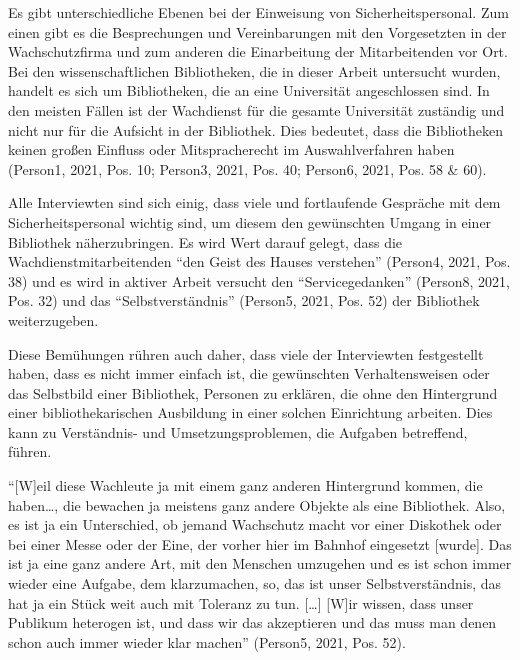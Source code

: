 \documentclass[a4paper,
fontsize=11pt,
oneside,
numbers=noperiodatend,
parskip=half-,
bibliography=totoc,
final
]{scrartcl}
\begin{document}
Es gibt unterschiedliche Ebenen bei der Einweisung von
Sicherheitspersonal. Zum einen gibt es die Besprechungen und
Vereinbarungen mit den Vorgesetzten in der Wachschutzfirma und zum
anderen die Einarbeitung der Mitarbeitenden vor Ort. Bei den
wissenschaftlichen Bibliotheken, die in dieser Arbeit untersucht wurden,
handelt es sich um Bibliotheken, die an eine Universität angeschlossen
sind. In den meisten Fällen ist der Wachdienst für die gesamte
Universität zuständig und nicht nur für die Aufsicht in der Bibliothek.
Dies bedeutet, dass die Bibliotheken keinen großen Einfluss oder
Mitspracherecht im Auswahlverfahren haben (Person1, 2021, Pos. 10;
Person3, 2021, Pos. 40; Person6, 2021, Pos. 58 \& 60).

Alle Interviewten sind sich einig, dass viele und fortlaufende Gespräche
mit dem Sicherheitspersonal wichtig sind, um diesem den gewünschten
Umgang in einer Bibliothek näherzubringen. Es wird Wert darauf gelegt,
dass die Wachdienstmitarbeitenden \enquote{den Geist des Hauses
verstehen} (Person4, 2021, Pos. 38) und es wird in aktiver Arbeit
versucht den \enquote{Servicegedanken} (Person8, 2021, Pos. 32) und das
\enquote{Selbstverständnis} (Person5, 2021, Pos. 52) der Bibliothek
weiterzugeben.

Diese Bemühungen rühren auch daher, dass viele der Interviewten
festgestellt haben, dass es nicht immer einfach ist, die gewünschten
Verhaltensweisen oder das Selbstbild einer Bibliothek, Personen zu
erklären, die ohne den Hintergrund einer bibliothekarischen Ausbildung
in einer solchen Einrichtung arbeiten. Dies kann zu Verständnis- und
Umsetzungsproblemen, die Aufgaben betreffend, führen.

\begin{flushright}
\enquote{{[}W{]}eil diese Wachleute ja mit einem ganz anderen
Hintergrund kommen, die haben\ldots, die bewachen ja meistens ganz
andere Objekte als eine Bibliothek. Also, es ist ja ein Unterschied, ob
jemand Wachschutz macht vor einer Diskothek oder bei einer Messe oder
der Eine, der vorher hier im Bahnhof eingesetzt {[}wurde{]}. Das ist ja
eine ganz andere Art, mit den Menschen umzugehen und es ist schon immer
wieder eine Aufgabe, dem klarzumachen, so, das ist unser
Selbstverständnis, das hat ja ein Stück weit auch mit Toleranz zu tun.
{[}\ldots{]} {[}W{]}ir wissen, dass unser Publikum heterogen ist, und
dass wir das akzeptieren und das muss man denen schon auch immer wieder
klar machen} \linebreak(Person5, 2021, Pos. 52).
\end{flushright}
\end{document}
